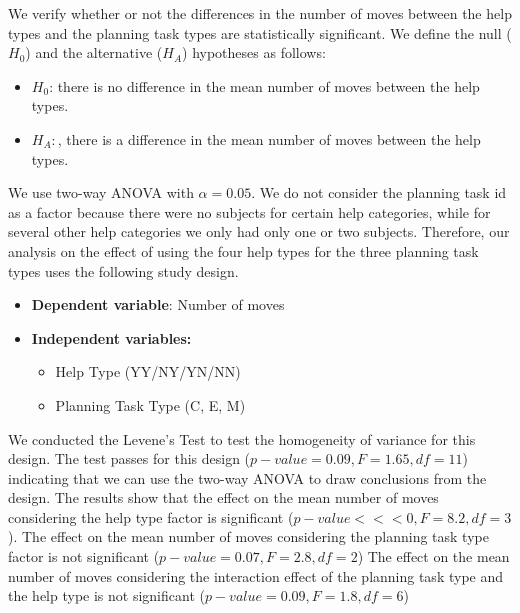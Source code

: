 We verify whether or not the differences in the number of moves between the help types and the planning task types are statistically significant.
We define the null ($H_0$) and the alternative ($H_A$) hypotheses as follows:
\begin{itemize}
\item $H_0$: there is no difference in the mean number of moves between the help types.
\item $H_A:$, there is a difference in the mean number of moves between the help types.
\end{itemize}
We use two-way ANOVA with $\alpha=0.05$.
We do not consider the planning task id as a factor because there were no subjects for certain help categories, while for several other help categories we only had only one or two subjects.
Therefore, our analysis on the effect of using the four help types for the three planning task types uses the following study design.
\begin{itemize}
\item \textbf{Dependent variable}: Number of moves
\item \textbf{Independent variables:}
\begin{itemize}
\item Help Type (YY/NY/YN/NN)
\item Planning Task Type (C, E, M)
\end{itemize}
\end{itemize}
We conducted the Levene's Test to test the homogeneity of variance for this design.
The test passes for this design ($p-value=0.09, F=1.65, df=11$) indicating that we can use the two-way ANOVA to draw conclusions from the design.
The results show that the effect on the mean number of moves considering the help type factor is significant ($p-value<<<0, F=8.2, df=3$).
The effect on the mean number of moves considering the planning task type factor is not significant ($p-value=0.07, F=2.8, df=2$)
The effect on the mean number of moves considering the interaction effect of the planning task type and the help type is not significant ($p-value=0.09, F=1.8, df=6$)


